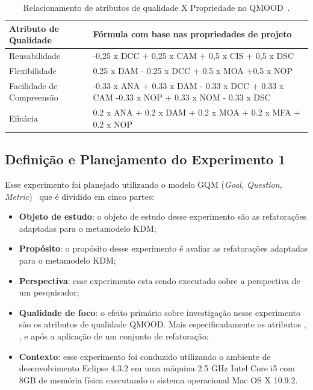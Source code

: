 \begin{table}[!h]
\caption{Relacionamento de atributos de qualidade X Propriedade no QMOOD~\cite{Bansiya_QMOOD}.}
\label{tab:QMOOD_quality_metrics2}
\begin{center}
\begin{tabular}{ | m{4cm} | m{10cm} |} 
\hline
Atributo de Qualidade & Fórmula com base nas propriedades de projeto  \\ 
\hline
Reusabilidade & -0,25 x DCC + 0,25 x CAM + 0,5 x CIS + 0,5 x DSC  \\ 
\hline
Flexibilidade & 0.25 x DAM - 0.25 x DCC + 0.5 x MOA +0.5 x NOP \\
\hline
Facilidade de Compreensão & -0.33 x ANA + 0.33 x DAM - 0.33 x DCC + 0.33 x CAM -0.33 x NOP + 0.33 x NOM - 0.33 x DSC \\ 
\hline
Eficácia & 0.2 x ANA + 0.2 x DAM + 0.2 x MOA + 0.2 x MFA + 0.2 x NOP \\ 
\hline
\end{tabular}
\end{center}
\end{table}

\subsection{Definição e Planejamento do Experimento 1}

Esse experimento foi planejado utilizando o modelo GQM (\textit{Goal, Question, Metric})~\cite{Wohlin} que é dividido em cinco partes: 

\begin{itemize}
\item \textbf{Objeto de estudo}: o objeto de estudo desse experimento são as refatorações adaptadas para o metamodelo KDM;
\item \textbf{Propósito}: o propósito desse experimento é avaliar as refatorações adaptadas para o metamodelo KDM;
\item \textbf{Perspectiva}: esse experimento esta sendo executado sobre a perspectiva de um pesquisador;
\item \textbf{Qualidade de foco}: o efeito primário sobre investigação nesse experimento são os atributos de qualidade QMOOD. Mais especificadamente os atributos , ,  e  após a aplicação de um conjunto de refatoração;
\item \textbf{Contexto}: esse experimento foi conduzido utilizando o ambiente de desenvolvimento Eclipse 4.3.2 em uma máquina 2.5 GHz Intel Core i5 com 8GB de memória física executando o sistema operacional Mac OS X 10.9.2.
\end{itemize}



